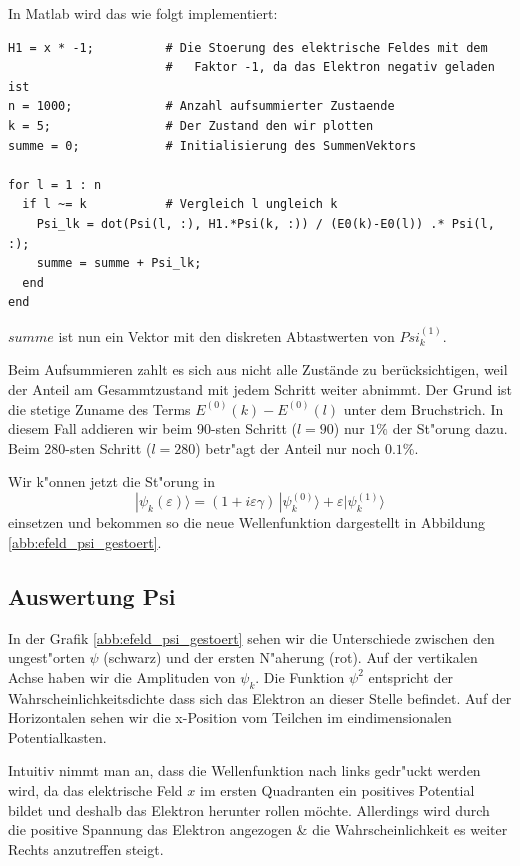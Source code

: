 \begin{refsection}
In Matlab wird das wie folgt implementiert:
\begin{lstlisting}[style=Matlab]
H1 = x * -1;          # Die Stoerung des elektrische Feldes mit dem
                      #   Faktor -1, da das Elektron negativ geladen ist
n = 1000;             # Anzahl aufsummierter Zustaende
k = 5;                # Der Zustand den wir plotten
summe = 0;            # Initialisierung des SummenVektors

for l = 1 : n
  if l ~= k           # Vergleich l ungleich k
    Psi_lk = dot(Psi(l, :), H1.*Psi(k, :)) / (E0(k)-E0(l)) .* Psi(l, :);
    summe = summe + Psi_lk;
  end
end
\end{lstlisting}
$summe$ ist nun ein Vektor mit den diskreten Abtastwerten von $Psi_k^{(1)}$.

Beim Aufsummieren zahlt es sich aus nicht alle Zust\"ande zu ber\"ucksichtigen, weil der Anteil am Gesammtzustand 
mit jedem Schritt weiter abnimmt. Der Grund ist die stetige Zuname des Terms 
$E^{(0)}(k)-E^{(0)}(l)$ unter dem Bruchstrich.
In diesem Fall addieren wir beim 90-sten Schritt ($l=90$) nur $1\%$ der St"orung dazu.
Beim 280-sten Schritt ($l=280$) betr"agt der Anteil nur noch $0.1\%$.

Wir k"onnen jetzt die St"orung in 
\begin{equation}
|\psi_k(\varepsilon)\rangle
=
(1+i\varepsilon \gamma)
\,|\psi_k^{(0)}\rangle
+
\varepsilon|\psi_k^{(1)}\rangle
\end{equation}
einsetzen und bekommen so die neue Wellenfunktion dargestellt in Abbildung \ref{abb:efeld_psi_gestoert}.




\subsection{Auswertung Psi}

In der Grafik \ref{abb:efeld_psi_gestoert} sehen wir die Unterschiede zwischen den ungest"orten $\psi$ (schwarz) und der ersten N"aherung (rot).
Auf der vertikalen Achse haben wir die Amplituden von $\psi_k$.
Die Funktion $\psi^2$ entspricht der Wahrscheinlichkeitsdichte dass sich das Elektron an dieser Stelle befindet.
Auf der Horizontalen sehen wir die x-Position vom Teilchen im eindimensionalen Potentialkasten.

Intuitiv nimmt man an, dass die Wellenfunktion nach links gedr"uckt werden wird, da das
elektrische Feld $x$ im ersten Quadranten ein positives Potential bildet
und deshalb das Elektron herunter rollen m\"ochte.
Allerdings wird durch die positive Spannung das Elektron angezogen \& die
Wahrscheinlichkeit es weiter Rechts anzutreffen steigt.


\end{refsection}
